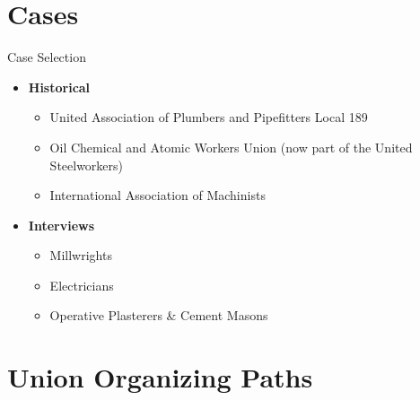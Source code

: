 \documentclass{beamer}
\begin{document}
\section{Cases}
\begin{frame}{Case Selection}
	\begin{itemize}
		\item \textbf{Historical}
		\begin{itemize}
			\item United Association of Plumbers and Pipefitters Local 189
			\item Oil Chemical and Atomic Workers Union (now part of the United Steelworkers)
			\item International Association of Machinists
		\end{itemize}
		\item \textbf{Interviews}
		\begin{itemize}
			\item Millwrights
			\item Electricians
			\item Operative Plasterers \& Cement Masons
		\end{itemize}
	\end{itemize}
\end{frame}

\section{Union Organizing Paths}
\end{document}
